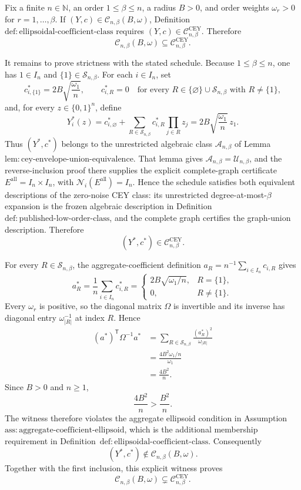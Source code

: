Fix a finite \(n\in\mathbb N\), an order \(1\leq\beta\leq n\), a radius
\(B>0\), and order weights \(\omega_r>0\) for
\(r=1,\ldots,\beta\).  If
\((Y,c)\in\mathcal C_{n,\beta}(B,\omega)\),
Definition~\(\mathrm{def{:}ellipsoidal\text{-}coefficient\text{-}class}\)
requires \((Y,c)\in\mathcal C^{\mathrm{CEY}}_{n,\beta}\).  Therefore
\[
\mathcal C_{n,\beta}(B,\omega)
\subseteq
\mathcal C^{\mathrm{CEY}}_{n,\beta}.
\]

It remains to prove strictness with the stated schedule.  Because
\(1\leq\beta\leq n\), one has \(1\in I_n\) and
\(\{1\}\in\mathcal S_{n,\beta}\).  For each \(i\in I_n\), set
\[
c^*_{i,\{1\}}=2B\sqrt{\frac{\omega_1}{n}},
\qquad
c^*_{i,R}=0
\quad
\text{for every }R\in\{\varnothing\}\cup\mathcal S_{n,\beta}
\text{ with }R\neq\{1\},
\]
and, for every \(z\in\{0,1\}^n\), define
\[
Y_i^*(z)
=c^*_{i,\varnothing}
+\sum_{R\in\mathcal S_{n,\beta}}c^*_{i,R}
  \prod_{j\in R}z_j
=2B\sqrt{\frac{\omega_1}{n}}\,z_1.
\]
Thus \((Y^*,c^*)\) belongs to the unrestricted algebraic class
\(\mathcal A_{n,\beta}\) of
Lemma~\(\mathrm{lem{:}cey\text{-}envelope\text{-}union\text{-}equivalence}\).
That lemma gives
\(\mathcal A_{n,\beta}=\mathcal U_{n,\beta}\), and the reverse-inclusion
proof there supplies the explicit complete-graph certificate
\(E^{\mathrm{all}}=I_n\times I_n\), with
\(\mathcal N_i(E^{\mathrm{all}})=I_n\).  Hence the schedule satisfies both
equivalent descriptions of the zero-noise CEY class: its unrestricted
degree-at-most-\(\beta\) expansion is the frozen algebraic description in
Definition~\(\mathrm{def{:}published\text{-}low\text{-}order\text{-}class}\),
and the complete graph certifies the graph-union description.  Therefore
\[
(Y^*,c^*)\in\mathcal C^{\mathrm{CEY}}_{n,\beta}.
\]

For every \(R\in\mathcal S_{n,\beta}\), the aggregate-coefficient definition
\(a_R=n^{-1}\sum_{i\in I_n}c_{i,R}\) gives
\[
a_R^*
=\frac{1}{n}\sum_{i\in I_n}c^*_{i,R}
=
\begin{cases}
2B\sqrt{\omega_1/n},&R=\{1\},\\
0,&R\neq\{1\}.
\end{cases}
\]
Every \(\omega_r\) is positive, so the diagonal matrix \(\Omega\) is
invertible and its inverse has diagonal entry \(\omega_{|R|}^{-1}\) at
index \(R\).  Hence
\[
\begin{aligned}
(a^*)^{\mathsf T}\Omega^{-1}a^*
&=\sum_{R\in\mathcal S_{n,\beta}}
  \frac{(a_R^*)^2}{\omega_{|R|}}\\
&=\frac{4B^2\omega_1/n}{\omega_1}\\
&=\frac{4B^2}{n}.
\end{aligned}
\]
Since \(B>0\) and \(n\geq1\),
\[
\frac{4B^2}{n}>\frac{B^2}{n}.
\]
The witness therefore violates the aggregate ellipsoid condition in
Assumption~\(\mathrm{ass{:}aggregate\text{-}coefficient\text{-}ellipsoid}\),
which is the additional membership requirement in
Definition~\(\mathrm{def{:}ellipsoidal\text{-}coefficient\text{-}class}\).
Consequently
\[
(Y^*,c^*)\notin\mathcal C_{n,\beta}(B,\omega).
\]
Together with the first inclusion, this explicit witness proves
\[
\mathcal C_{n,\beta}(B,\omega)
\subsetneq
\mathcal C^{\mathrm{CEY}}_{n,\beta}.
\]